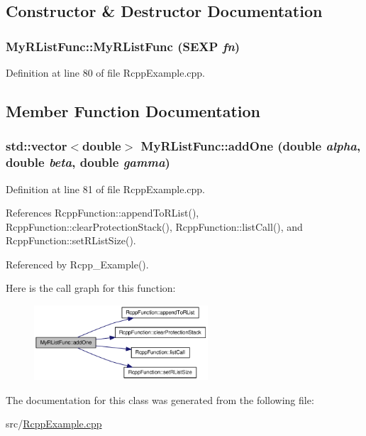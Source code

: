 \subsection{Constructor \& Destructor Documentation}
\hypertarget{classMyRListFunc_7ab78b186d110497a404f88009455af6}{
\subsubsection[MyRListFunc]{\setlength{\rightskip}{0pt plus 5cm}MyRListFunc::MyRListFunc (SEXP {\em fn})}}
\label{classMyRListFunc_7ab78b186d110497a404f88009455af6}




Definition at line 80 of file RcppExample.cpp.

\subsection{Member Function Documentation}
\hypertarget{classMyRListFunc_0dec3b59e1e235c0502594a5d92cae13}{
\subsubsection[addOne]{\setlength{\rightskip}{0pt plus 5cm}std::vector$<$double$>$ MyRListFunc::addOne (double {\em alpha}, \/  double {\em beta}, \/  double {\em gamma})}}
\label{classMyRListFunc_0dec3b59e1e235c0502594a5d92cae13}




Definition at line 81 of file RcppExample.cpp.

References RcppFunction::appendToRList(), RcppFunction::clearProtectionStack(), RcppFunction::listCall(), and RcppFunction::setRListSize().

Referenced by Rcpp\_\-Example().

Here is the call graph for this function:\nopagebreak
\begin{figure}[H]
\begin{center}
\leavevmode
\includegraphics[width=184pt]{classMyRListFunc_0dec3b59e1e235c0502594a5d92cae13_cgraph}
\end{center}
\end{figure}


The documentation for this class was generated from the following file:\begin{CompactItemize}
\item 
src/\hyperlink{RcppExample_8cpp}{RcppExample.cpp}\end{CompactItemize}
